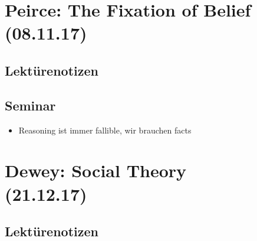 \documentclass[emulatestandardclasses]{scrartcl}
\begin{document}
\section{Peirce: The Fixation of Belief\\(08.11.17)}

\subsection{Lektürenotizen}

\subsection{Seminar}

\begin{itemize}
  \item Reasoning ist immer fallible, wir brauchen facts
\end{itemize}

\section{Dewey: Social Theory\\(21.12.17)}

\subsection{Lektürenotizen}
\end{document}
